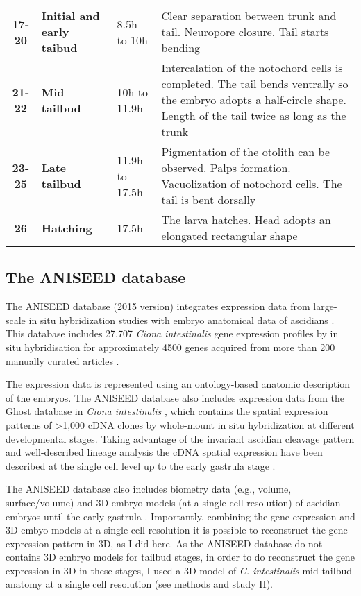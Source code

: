 \begin{sidewaystable}
\begin{tabular}{|c|p{3cm}|p{3cm}|p{10cm}|}
%
\textbf{17-20}	& \textbf{Initial and early taibud}	& 8.5h to 10h	& Clear separation between trunk and tail. Neuropore closure. Tail starts bending \\
%
\textbf{21-22}	& \textbf{Mid tailbud}	& 10h to 11.9h	& Intercalation of the notochord cells is completed. The tail bends ventrally so the embryo adopts a half-circle shape. Length of the tail twice as long as the trunk	\\
%
\textbf{23-25}	& \textbf{Late tailbud}	& 11.9h to 17.5h 	& Pigmentation of the otolith can be observed. Palps formation. Vacuolization of notochord cells. The tail is bent dorsally   \\
%
\textbf{26}		& \textbf{Hatching}	& 17.5h 	& The larva hatches. Head adopts an elongated rectangular shape \\

\hline
\end{tabular}
\end{sidewaystable}

\subsection{The ANISEED database}

The ANISEED database (2015 version) integrates expression data from large-scale in situ hybridization studies with embryo anatomical data of ascidians \citep{Tassy2010,Brozovic2016}. 
This database includes 27,707 \textit{Ciona intestinalis} gene expression profiles by in situ hybridisation for approximately 4500 genes acquired from more than 200 manually curated articles \citep{Brozovic2016}.

The expression data is represented using an ontology-based anatomic description of the embryos. The ANISEED database also includes expression data from the Ghost database in \textit{Ciona intestinalis} \citep{Satou2005}, which contains the spatial expression patterns of  >1,000 cDNA clones by whole-mount in situ hybridization at different developmental stages.
Taking advantage of the invariant ascidian cleavage pattern and well-described lineage analysis \citep{Conklin1905,Nishida1987} the cDNA spatial expression have been described at the single cell level up to the early gastrula stage \citep{Imai2004}.

The ANISEED database also includes biometry data (e.g., volume, surface/volume) and 3D embryo models (at a single-cell resolution) of ascidian embryos until the early gastrula \citep{Tassy2006}. Importantly, combining the gene expression and 3D embyo models at a single cell resolution it is possible to reconstruct the gene expression pattern in 3D, as I did here. 
As the ANISEED database do not contains 3D embryo models for tailbud stages, in order to do reconstruct the gene expression in 3D in these stages, I used a 3D model of \textit{C. intestinalis} mid tailbud anatomy at a single cell resolution \citep{Nakamura2012}(see methods and study II).
